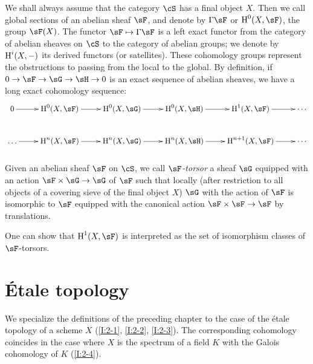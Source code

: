 We shall always assume that the category $\cS$ has a final object $X$. Then we 
call global sections of an abelian sheaf $\sF$, and denote by 
$\Gamma\sF$ or $\h^0(X,\sF)$, the group $\sF(X)$. The functor 
$\sF\mapsto\Gamma\sF$ is a left exact functor from the category of 
abelian sheaves on $\cS$ to the category of abelian groups; we denote by 
$\operatorname{H}^i(X,-)$ its derived functors (or satellites). These cohomology groups 
represent the obstructions to passing from the local to the global. By definition, if 
$0\to\sF\to\sG\to\sH\to 0$ is an exact sequence of abelian sheaves, we have a long 
exact cohomology sequence:
\[\xymatrix{
  0 \ar[r] 
    & \h^0(X,\sF) \ar[r] 
    & \h^0(X,\sG) \ar[r] 
    & \h^0(X,\sH) \ar[r] 
    & \h^1(X,\sF) \ar[r] 
    & \cdots \\
  \ldots \ar[r] 
    & \h^n(X,\sF) \ar[r] 
    & \h^n(X,\sG) \ar[r]
    & \h^n(X,\sH) \ar[r] 
    & \h^{n+1}(X,\sF) \ar[r] 
    & \cdots
}\]





\subsubsection{}\label{I:1-6-6}

Given an abelian sheaf $\sF$ on $\cS$, we call 
\emph{$\sF$-torsor} a sheaf $\sG$ equipped with an action $\sF\times\sG\to\sG$ 
of $\sF$ such that locally (after restriction to all objects of a
covering sieve of the final object $X$) $\sG$ with the action of $\sF$ is 
isomorphic to $\sF$ equipped with the canonical action $\sF\times \sF\to \sF$ by 
translations. 

One can show that $\h^1(X,\sF)$ is interpreted as the set of isomorphism classes 
of $\sF$-torsors. 




















\section{\'Etale topology}\label{I:2}

We specialize the definitions of the preceding chapter to the case of the 
\'etale topology of a scheme $X$ (\ref{I:2-1}, \ref{I:2-2}, \ref{I:2-3}). The 
corresponding cohomology coincides in the case where $X$ is the spectrum of a 
field $K$ with the Galois cohomology of $K$ (\ref{I:2-4}). 










